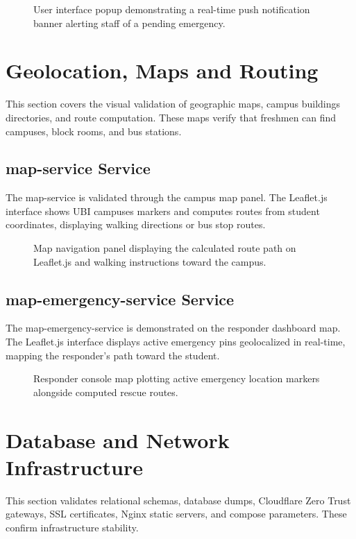 \documentclass[12pt]{article}
\begin{document}
\begin{figure}[htbp]
    \centering
    \caption{User interface popup demonstrating a real-time push notification banner alerting staff of a pending emergency.}
    \label{fig:push_notification}
\end{figure}

\section{Geolocation, Maps and Routing}
This section covers the visual validation of geographic maps, campus buildings directories, and route computation. These maps verify that freshmen can find campuses, block rooms, and bus stations.

\subsection{map-service Service}
The map-service is validated through the campus map panel. The Leaflet.js interface shows UBI campuses markers and computes routes from student coordinates, displaying walking directions or bus stop routes.

\begin{figure}[htbp]
    \centering
    \caption{Map navigation panel displaying the calculated route path on Leaflet.js and walking instructions toward the campus.}
    \label{fig:map_routing}
\end{figure}

\subsection{map-emergency-service Service}
The map-emergency-service is demonstrated on the responder dashboard map. The Leaflet.js interface displays active emergency pins geolocalized in real-time, mapping the responder's path toward the student.

\begin{figure}[htbp]
    \centering
    \caption{Responder console map plotting active emergency location markers alongside computed rescue routes.}
    \label{fig:responder_map}
\end{figure}

\section{Database and Network Infrastructure}
This section validates relational schemas, database dumps, Cloudflare Zero Trust gateways, SSL certificates, Nginx static servers, and compose parameters. These confirm infrastructure stability.
\end{document}

